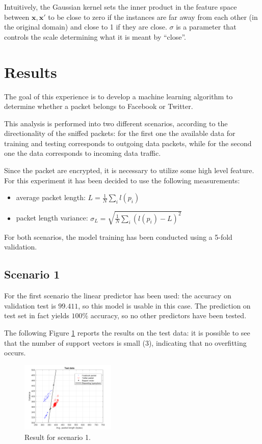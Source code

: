 \documentclass[a4paper, 11pt]{article}
\begin{document}
Intuitively, the Gaussian kernel sets the inner product in the feature space between $\mathbf{x}, \mathbf{x'}$ to be close to zero if the instances are far away from each other
(in the original domain) and close to 1 if they are close. $\sigma$ is a parameter that
controls the scale determining what it is meant by ``close''.

\section*{Results}
The goal of this experience is to develop a machine learning algorithm to determine whether a packet belongs to Facebook or Twitter.

This analysis is performed into two different scenarios, according to the directionality of the sniffed packets: for the first one the available data for training and testing corresponds to outgoing data packets, while for the second one the data corresponds to incoming data traffic.

Since the packet are encrypted, it is necessary to utilize some high level feature. For this experiment it has been decided to use the following measurements:
\begin{itemize}
    \item average packet length: $ L = \frac{1}{N} \sum\limits_{i} l(p_i)$
    \item packet length variance: $ \sigma_L = \sqrt{\frac{1}{N} \sum\limits_i \left( l(p_i) - L \right)^2}$
\end{itemize}

For both scenarios, the model training has been conducted using a 5-fold validation.

\subsection*{Scenario 1}
For the first scenario the linear predictor has been used: the accuracy on validation test is $99.411$, so this model is usable in this case. The prediction on test set in fact yields $100\%$ accuracy, so no other predictors have been tested.

The following Figure \ref{fig:s1_linear_vector} reports the results on the test data: it is possible to see that the number of support vectors is small ($3$), indicating that no overfitting occurs.

\begin{figure}[H]
    \centering
    \includegraphics[width=0.4\textwidth]{s1_linear_vector}
    \caption{Result for scenario 1.}
    \label{fig:s1_linear_vector}
\end{figure}
\end{document}
